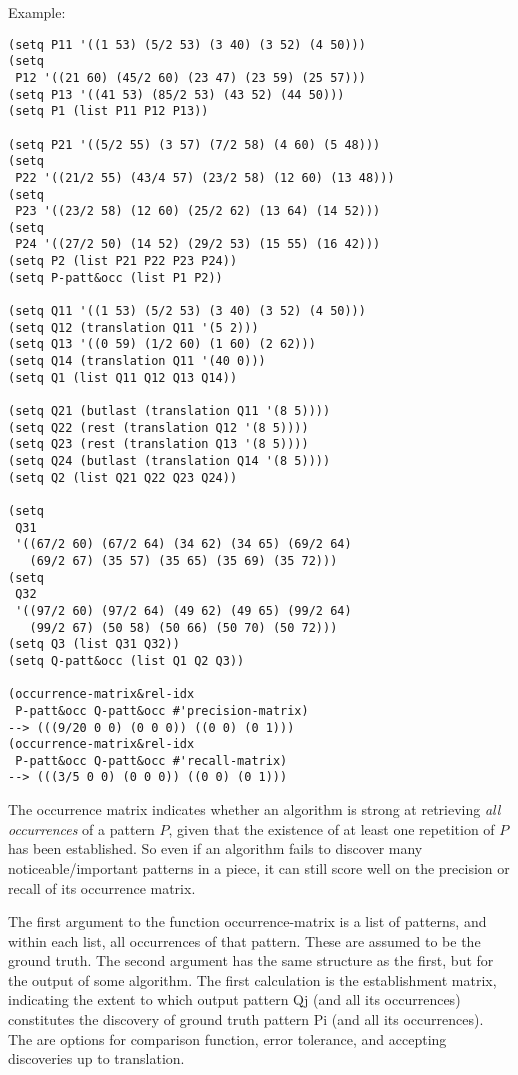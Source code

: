 \vspace{0.5cm}
\noindent Example:
\begin{verbatim}
(setq P11 '((1 53) (5/2 53) (3 40) (3 52) (4 50)))
(setq
 P12 '((21 60) (45/2 60) (23 47) (23 59) (25 57)))
(setq P13 '((41 53) (85/2 53) (43 52) (44 50)))
(setq P1 (list P11 P12 P13))

(setq P21 '((5/2 55) (3 57) (7/2 58) (4 60) (5 48)))
(setq
 P22 '((21/2 55) (43/4 57) (23/2 58) (12 60) (13 48)))
(setq
 P23 '((23/2 58) (12 60) (25/2 62) (13 64) (14 52)))
(setq
 P24 '((27/2 50) (14 52) (29/2 53) (15 55) (16 42)))
(setq P2 (list P21 P22 P23 P24))
(setq P-patt&occ (list P1 P2))

(setq Q11 '((1 53) (5/2 53) (3 40) (3 52) (4 50)))
(setq Q12 (translation Q11 '(5 2)))
(setq Q13 '((0 59) (1/2 60) (1 60) (2 62)))
(setq Q14 (translation Q11 '(40 0)))
(setq Q1 (list Q11 Q12 Q13 Q14))

(setq Q21 (butlast (translation Q11 '(8 5))))
(setq Q22 (rest (translation Q12 '(8 5))))
(setq Q23 (rest (translation Q13 '(8 5))))
(setq Q24 (butlast (translation Q14 '(8 5))))
(setq Q2 (list Q21 Q22 Q23 Q24))

(setq
 Q31
 '((67/2 60) (67/2 64) (34 62) (34 65) (69/2 64)
   (69/2 67) (35 57) (35 65) (35 69) (35 72)))
(setq
 Q32
 '((97/2 60) (97/2 64) (49 62) (49 65) (99/2 64)
   (99/2 67) (50 58) (50 66) (50 70) (50 72)))
(setq Q3 (list Q31 Q32))
(setq Q-patt&occ (list Q1 Q2 Q3))

(occurrence-matrix&rel-idx
 P-patt&occ Q-patt&occ #'precision-matrix)
--> (((9/20 0 0) (0 0 0)) ((0 0) (0 1)))
(occurrence-matrix&rel-idx
 P-patt&occ Q-patt&occ #'recall-matrix)
--> (((3/5 0 0) (0 0 0)) ((0 0) (0 1)))
\end{verbatim}

\noindent The occurrence matrix indicates whether
an algorithm is strong at retrieving \emph{all
occurrences} of a pattern $P$, given that the
existence of at least one repetition of $P$ has been
established. So even if an algorithm fails to discover
many noticeable/important patterns in a piece, it can
still score well on the precision or recall of its
occurrence matrix.

The first argument to the function occurrence-matrix
is a list of patterns, and within each list, all
occurrences of that pattern. These are assumed to be
the ground truth. The second argument has the same
structure as the first, but for the output of some
algorithm. The first calculation is the establishment
matrix, indicating the extent to which output pattern
Qj (and all its occurrences) constitutes the discovery
of ground truth pattern Pi (and all its occurrences).
The are options for comparison function, error
tolerance, and accepting discoveries up to
translation.

